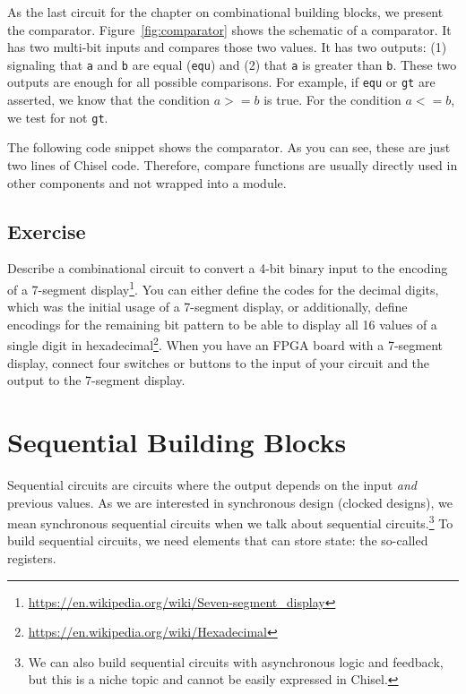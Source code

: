 \documentclass[%
    10pt,
    headinclude, footexclude,
    openright, %
    notitlepage,
    cleardoubleempty,
    headsepline,
    pointlessnumbers,
    bibtotoc, idxtotoc,
    ]{scrbook}
\newcommand{\code}[1]{{\lstinline[basicstyle=\small\ttfamily]{#1}}}
\newcommand{\myref}[2]{\href{#1}{#2}}
\renewcommand{\myref}[2]{{#2}{\footnote{\url{#1}}}}
\begin{document}
As the last circuit for the chapter on combinational building blocks, we present the comparator.
Figure~\ref{fig:comparator} shows the schematic of a comparator. It has two multi-bit inputs and
compares those two values. It has two outputs: (1) signaling that \code{a} and \code{b} are equal (\code{equ})
and (2) that \code{a} is greater than \code{b}. These two outputs are enough for all possible
comparisons. For example, if \code{equ} or \code{gt} are asserted, we know that the condition
$a >= b$ is true. For the condition $a <= b$, we test for not \code{gt}.

The following code snippet shows the comparator. As you can see, these are just two lines of
Chisel code. Therefore, compare functions are usually directly used in other components and
not wrapped into a module.


\section{Exercise}

Describe a combinational circuit to convert a 4-bit binary input to the encoding of a
\myref{https://en.wikipedia.org/wiki/Seven-segment_display}{7-segment display}.
You can either define the codes for the decimal digits, which was the initial
usage of a 7-segment display, or additionally, define encodings for the remaining bit pattern
to be able to display all 16 values of a single digit in
\myref{https://en.wikipedia.org/wiki/Hexadecimal}{hexadecimal}.
When you have an FPGA board with a 7-segment display, connect four switches or
buttons to the input of your circuit and the output to the 7-segment display.

\chapter{Sequential Building Blocks}
\label{sec:sequential}

Sequential circuits are circuits where the output depends on the input \emph{and}
previous values. As we are interested in synchronous design (clocked designs),
we mean synchronous sequential circuits when we talk about sequential
circuits.\footnote{We can also build sequential circuits with asynchronous logic and
feedback, but this is a niche topic and cannot be easily expressed in Chisel.}
To build sequential circuits, we need elements that can store state:
the so-called registers.
\end{document}
